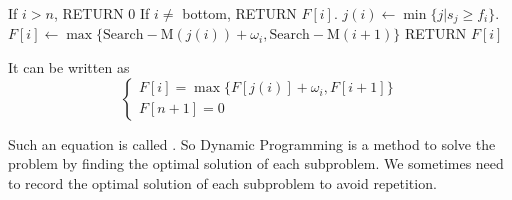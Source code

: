 \begin{algorithm}
    \caption{ $ \mathrm{Search-Memorization}(i) $}
    \begin{algorithmic}[1]
        \STATE If  $ i>n $, RETURN 0
        \STATE If  $ i\neq $  bottom, RETURN  $ F[i] $.
        \STATE  $ j(i)\leftarrow \min\{j|s_j \geq f_i\} $.
        \STATE  $ F[i]\leftarrow \max\{\mathrm{Search-M}(j(i))+\omega_i,\mathrm{Search-M}(i+1)\}  $ 
        \STATE RETURN  $ F[i] $
    \end{algorithmic}
\end{algorithm}

It can be written as 
\[\begin{cases}
    F[i]=\max\{F[j(i)]+\omega_i,F[i+1]\}\\
    F[n+1]=0
\end{cases}\]

Such an equation is called . So Dynamic Programming is a method to solve the problem by finding the optimal solution of each subproblem. We sometimes need to record the optimal solution of each subproblem to avoid repetition.